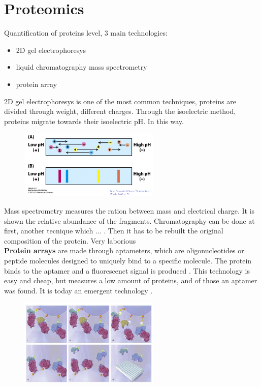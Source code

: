 \section{Proteomics}
Quantification of proteins level, 3 main technologies:
\begin{itemize}
\item 2D gel electrophoresys
\item liquid chromatography mass spectrometry
\item protein array
\end{itemize}

2D gel electrophoresys is one of the most common techniques, proteins are divided through weight, different charges. Through the isoelectric method, proteins migrate towards their isoelectric pH. In this way.


\begin{figure}[h]
\caption{}
\centering
\includegraphics[width=0.6\textwidth]{IsoelectricProteinSeparation}
\end{figure}

Mass spectrometry measures the ration between mass and electrical charge. It is shown the relative abundance of the fragments. Chromatography can be done at first, another tecnique which ... . Then it has to be rebuilt the original composition of the protein. Very laborious\\

\textbf{Protein arrays} are made through aptameters, which are oligonucleotides or peptide molecules designed to uniquely bind to a specific molecule. The protein binds to the aptamer and a fluorescenct signal is produced .
This technology is easy and cheap, but measures a low amount of proteins, and of those an aptamer was found. It is today an emergent technology \cite{neaguProteinMicroarrayTechnology2019}.

\begin{figure}[h]
\caption{}
\centering
\includegraphics[width=0.6\textwidth]{ProteinArray}
\end{figure}

